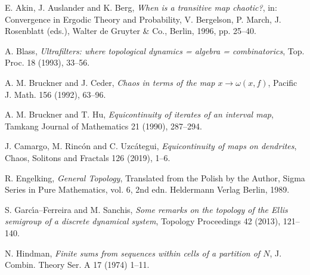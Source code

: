 \documentclass[12pt]{amsart}
\theoremstyle{definition}
\numberwithin{equation}{section}
\begin{document}
\begin{thebibliography}{[HD82]}




\normalsize
\baselineskip=17pt



E. Akin, J. Auslander and K. Berg,
\emph{When is a transitive map chaotic?},
in: Convergence in Ergodic Theory and Probability, V. Bergelson, P. March, J. Rosenblatt (eds.),
Walter de Gruyter \& Co., Berlin, 1996, pp. 25--40.

A. Blass,
\emph{Ultrafilters: where topological dynamics = algebra = combinatorics},
Top. Proc.
18 (1993), 33--56.

A. M. Bruckner and J. Ceder,
\emph{Chaos in terms of the map $x\rightarrow\omega(x,f)$},
Pacific J. Math.
156 (1992), 63--96.

A. M. Bruckner and T. Hu,
\emph{Equicontinuity of iterates of an interval map},
Tamkang Journal of Mathematics
21 (1990), 287--294.

J. Camargo, M. Rinc\'on and C. Uzc\'ategui,
\emph{Equicontinuity of maps on dendrites},
Chaos, Solitons and Fractals
126 (2019), 1--6.


R. Engelking, 
\emph{General Topology},
Translated from the Polish by the Author, Sigma Series in Pure Mathematics, vol. 6,
2nd edn. Heldermann Verlag Berlin, 1989.

S. Garc\'{\i}a--Ferreira and M. Sanchis,
\emph{Some remarks on the topology of the Ellis semigroup of a discrete dynamical system},
Topology Proceedings
42 (2013), 121--140.

N. Hindman,
\emph{Finite sums from sequences within cells of a partition of {$N$}},
J. Combin. Theory Ser. A
17 (1974) 1--11.


\end{thebibliography}
\end{document}

